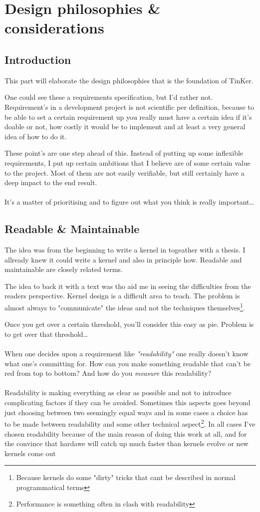 \part{Design philosophies \& considerations}
\chapter{Introduction}
This part will elaborate the design philosophies that is the foundation of TinKer.

One could see these a requirements specification, but I'd rather not. Requirement's in a development project is not scientific per definition, because to be able to set a certain requirement up you really must have a certain idea if it's doable or not, how costly it would be to implement and at least a very general idea of how to do it.

These point's are one step ahead of this. Instead of putting up some inflexible requirements, I put up certain ambitions that I believe are of some certain value to the project. Most of them are not easily verifiable, but still certainly have a deep impact to the end result.
\\\\
It's a matter of prioritising and to figure out what you think is really important\ldots

\chapter{Readable \& Maintainable}
The idea was from the beginning to write a kernel in togeather with a thesis. I allready knew it could write a kernel and also in principle how. Readable and maintainable are closely related terms. 

The idea to back it with a text was tho aid me in seeing the difficulties from the readers perspective. Kernel design is a difficult area to teach. The problem is almost always to "communicate" the ideas and not the techniques themselves\footnote{Because kernels do some "dirty" tricks that cant be described in normal programmatical terms}. 

Once you get over a certain threshold, you'll consider this easy as pie. Problem is to get over that threshold\ldots
\\\\
When one decides upon a requirement like \textit{"readability"} one really doesn't know what one's committing for. How can you make something readable that can't be red from top to bottom? And how do you \textit{measure} this readability?
\\\\
Readability is making everything as clear as possible and not to introduce complicating factors if they can be avoided. Sometimes this aspects goes beyond just choosing between two seemingly equal ways and in some cases a choice has to be made between readability and some other technical aspect\footnote{Performance is something often in clash with readability}. In all cases I've chosen readability because of the main reason of doing this work at all, and for the convince that hardawe will catch up much faster than kernels evolve or new kernels come out 

